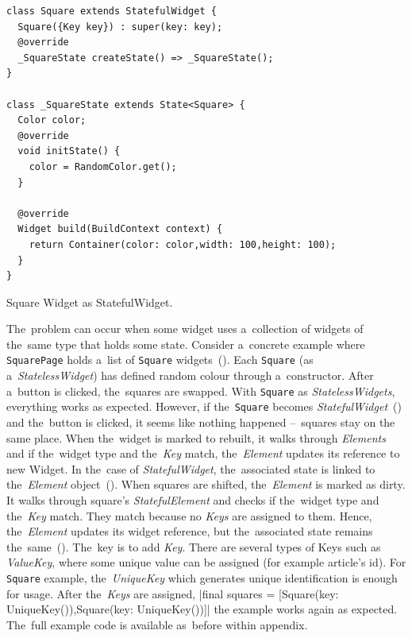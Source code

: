 \begin{listing}[!htb]
\begin{verbatim}
class Square extends StatefulWidget {
  Square({Key key}) : super(key: key);
  @override
  _SquareState createState() => _SquareState();
}

class _SquareState extends State<Square> {
  Color color;
  @override
  void initState() {
    color = RandomColor.get();
  }

  @override
  Widget build(BuildContext context) {
    return Container(color: color,width: 100,height: 100);
  }
}
\end{verbatim}
\caption{Square Widget as StatefulWidget.}
\label{listing:keys_square_stateful}
\end{listing}

The~problem can occur when some widget uses a~collection of widgets of the~same type that holds some state. Consider a~concrete example where \verb|SquarePage| holds a~list of \verb|Square| widgets~(). Each \verb|Square| (as a~\textit{StatelessWidget}) has defined random colour through a~constructor. After a~button is clicked, the~squares are swapped. With \verb|Square| as \textit{StatelessWidgets}, everything works as expected.
However, if the~\verb|Square| becomes \textit{StatefulWidget}~() and the~button is clicked, it seems like nothing happened --~squares stay on the same place. When the~widget is marked to rebuilt, it walks through \textit{Elements} and if the~widget type and the~\textit{Key} match, the~\textit{Element} updates its reference to new Widget. In the~case of \textit{StatefulWidget}, the~associated state is linked to the~\textit{Element} object~(). When squares are shifted, the~\textit{Element} is marked as dirty. It walks through square's \textit{StatefulElement} and checks if the~widget type and the~\textit{Key} match. They match because no \textit{Keys} are assigned to them. Hence, the~\textit{Element} updates its widget reference, but the~associated state remains the~same~(). 
The~key is to add \textit{Key}. There are several types of Keys such as \textit{ValueKey}, where some unique value can be assigned (for example article's id). For \verb|Square| example, the~\textit{UniqueKey} which generates unique identification is enough for usage. After the~\textit{Keys} are assigned, |final squares = [Square(key: UniqueKey()),Square(key: UniqueKey())]| the example works again as expected. The~full example code is available as~before within appendix.

